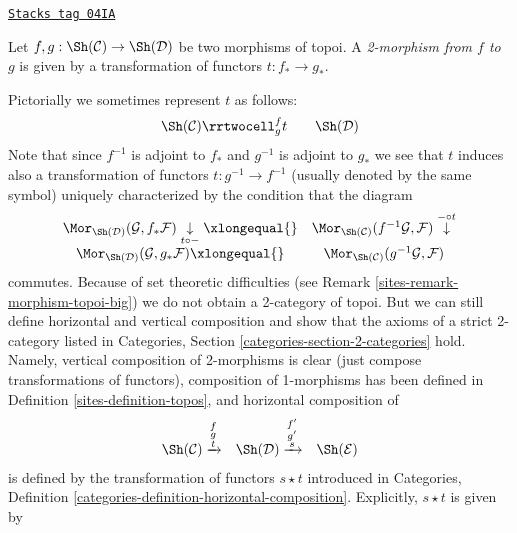 \begin{definition}
\label{sites-definition-2-morphism-topoi}
\href{https://stacks.math.columbia.edu/tag/04IA}{\texttt{Stacks tag 04IA}}

Let $f, g : \Sh(\mathcal{C}) \to \Sh(\mathcal{D})$
be two morphisms of topoi. A {\it 2-morphism from $f$ to $g$}
is given by a transformation of functors $t : f_* \to g_*$.
\end{definition}

Pictorially we sometimes represent $t$ as follows:
$$
\begin{array}{ccc}\Sh(\mathcal{C})
\rrtwocell^f_g{t} &  & \Sh(\mathcal{D})\end{array}
$$
Note that since $f^{-1}$ is adjoint to $f_*$ and
$g^{-1}$ is adjoint to $g_*$ we see that $t$ induces also
a transformation of functors
$t : g^{-1} \to f^{-1}$ (usually denoted by the same symbol)
uniquely characterized by the condition that the diagram
$$
\begin{array}{cc}\Mor_{\Sh(\mathcal{D})}(\mathcal{G}, f_*\mathcal{F})
\underset{t \circ -}{\downarrow}\xlongequal{} & \Mor_{\Sh(\mathcal{C})}(f^{-1}\mathcal{G}, \mathcal{F})
\overset{- \circ t}{\downarrow} \\ \Mor_{\Sh(\mathcal{D})}(\mathcal{G}, g_*\mathcal{F})
\xlongequal{} & \Mor_{\Sh(\mathcal{C})}(g^{-1}\mathcal{G}, \mathcal{F})\end{array}
$$
commutes. Because of set theoretic difficulties (see
Remark \ref{sites-remark-morphism-topoi-big})
we do not obtain a 2-category of topoi. But we can still define
horizontal and vertical composition and show that the axioms of a strict
2-category listed in
Categories, Section \ref{categories-section-2-categories}
hold.
Namely, vertical composition of 2-morphisms is clear (just compose
transformations of functors), composition of 1-morphisms has been
defined in
Definition \ref{sites-definition-topos},
and horizontal composition of
$$
\begin{array}{ccc}\Sh(\mathcal{C})
\xrightarrow{\substack{f\\g\\t}} & \Sh(\mathcal{D})
\xrightarrow{\substack{f'\\g'\\s}} & \Sh(\mathcal{E})\end{array}
$$
is defined by the transformation of functors $s \star t$
introduced in
Categories, Definition \ref{categories-definition-horizontal-composition}.
Explicitly, $s \star t$ is given by
